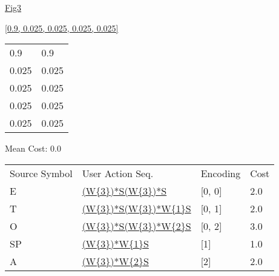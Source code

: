 \documentclass[12pt]{article}
\begin{document}
\noindent \url{Fig3}

\noindent \url{[0.9, 0.025, 0.025, 0.025, 0.025]}

\noindent\begin{tt}
\begin{small}
\begin{bundle}{}
\end{bundle}
\end{small}
\end{tt}
\newpage%
\begin{tabular}{l l}0.9	&	0.9\\
0.025	&	0.025\\
0.025	&	0.025\\
0.025	&	0.025\\
0.025	&	0.025\\
\end{tabular}\newpage
\noindent
\noindent Mean Cost: 0.0\\
\begin{tabular}{l l l l}
Source Symbol	&	User Action Seq.	&	Encoding	&	Cost\\
E	&	\url{(W{3})*S(W{3})*S}	&	[0, 0]	&	2.0\\
T	&	\url{(W{3})*S(W{3})*W{1}S}	&	[0, 1]	&	2.0\\
O	&	\url{(W{3})*S(W{3})*W{2}S}	&	[0, 2]	&	3.0\\
SP	&	\url{(W{3})*W{1}S}	&	[1]	&	1.0\\
A	&	\url{(W{3})*W{2}S}	&	[2]	&	2.0\\
\end{tabular}
\end{document}
